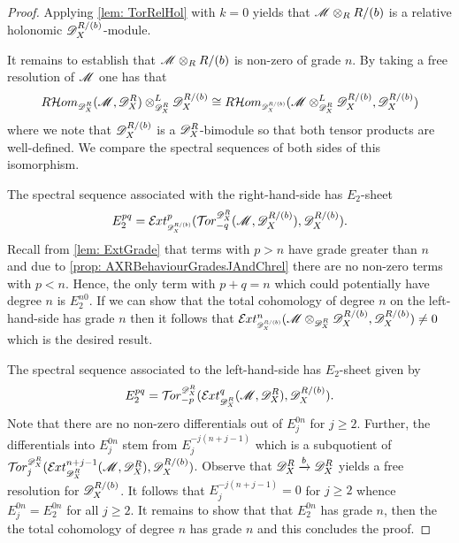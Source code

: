 \begin{proof}
  Applying \cref{lem: TorRelHol} with $k=0$ yields that $\mathscr{M} \otimes_R R/(b)$ is a relative holonomic $\mathscr{D}_X^{R/(b)}$-module.

  It remains to establish that $\mathscr{M} \otimes_R R/(b)$ is non-zero of grade $n$.
  By taking a free resolution of $\mathscr{M}$ one has that
  $$R\Hom_{\scaleto{\D_X^R}{8pt}}(\M,\D_X^R)\otimes_{\scaleto{\D_X^R}{8pt}}^L \D_X^{R/(b)} \cong R \Hom_{\scaleto{\D_X^{R/(b)}}{8pt}}(\M\otimes_{\scaleto{\D_X^R}{8pt}}^L \D_X^{R/(b)}, \D_X^{R/(b)}) $$
  where we note that $\mathscr{D}_X^{R/(b)}$ is a $\mathscr{D}_X^{R}$-bimodule so that both tensor products are well-defined.
  We compare the spectral sequences of both sides of this isomorphism.

  The spectral sequence associated with the right-hand-side has $E_2$-sheet
  $$E^{pq}_2 = \Ex{\D_X^{R/(b)}}{p}(\Tr{\D_X^R}{-q}(\M, \D_X^{R/(b)}), \D_X^{R/(b)}).$$
  Recall from \cref{lem: ExtGrade} that terms with $p>n$ have grade greater than $n$ and due to \cref{prop: AXRBehaviourGradesJAndChrel} there are no non-zero terms with $p<n$.
  Hence, the only term with $p+q = n$ which could potentially have degree $n$ is $E^{n0}_2$.
  If we can show that the total cohomology of degree $n$ on the left-hand-side has grade $n$ then it follows that $\Ex{\D_X^{R/(b)}}{n}(\M\otimes_{\scaleto{\D_X^R}{8pt}} \D_X^{R/(b)}, \D_X^{R/(b)}) \neq 0$ which is the desired result.

  The spectral sequence associated to the left-hand-side has $E_2$-sheet given by
  $$E_2^{pq} =\Tr{\D_X^R}{-p}( \Ex{\D_X^R}{q}(\M,\D_X^R), \D_X^{R/(b)}).$$
  Note that there are no non-zero differentials out of $E_j^{0n}$ for $j\geq 2$.
  Further, the differentials into $E^{0n}_j$ stem from $E^{-j(n+j-1)}_j$ which is a subquotient of $\Tr{\D_X^R}{j}(\Ex{\D_X^R}{n+j-1}(\M,\ab \D_X^R)\ab , \D_X^{R/(b)})$.
  Observe that $\mathscr{D}_X^R \xrightarrow{b} \mathscr{D}_X^R $ yields a free resolution for $\mathscr{D}_X^{R/(b)}$.
  It follows that $E^{-j(n+j-1)}_j=0$ for $j\geq 2$ whence $E_j^{0n} = E_2^{0n}$ for all $j\geq 2$.
  It remains to show that that $E_2^{0n}$ has grade $n$, then the the total cohomology of degree $n$ has grade $n$ and this concludes the proof.


\end{proof}
